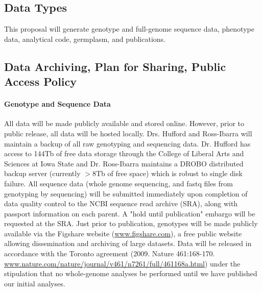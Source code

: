 %

\subsection*{Data Types}

This proposal will generate genotype and full-genome sequence data, phenotype data, analytical code, germplasm, and publications.

\subsection*{Data Archiving, Plan for Sharing, Public Access Policy}

\paragraph{Genotype and Sequence Data} 
All data will be made publicly available and stored online.  However, prior to public release, all data will be hosted locally.  Drs. Hufford and Ross-Ibarra will maintain a backup of all raw genotyping and sequencing data.  Dr. Hufford has access to 144Tb of free data storage through the College of Liberal Arts and Sciences at Iowa State and Dr. Ross-Ibarra maintains a DROBO distributed backup server (currently $>8$Tb of free space) which is robust to single disk failure. All sequence data (whole genome sequencing, and fastq files from genotyping by sequencing) will be submitted immediately upon completion of data quality control to the NCBI sequence read archive (SRA), along with passport information on each parent. A "hold until publication" embargo will be requested at the SRA. Just prior to publication, genotypes will be made publicly available via the Figshare website (\url{www.figshare.com}), a free public website allowing dissemination and archiving of large datasets. Data will be released in accordance with the Toronto agreement (2009. Nature 461:168-170. \url{www.nature.com/nature/journal/v461/n7261/full/461168a.html}) under the stipulation that no whole-genome analyses be performed until we have published our initial analyses.

